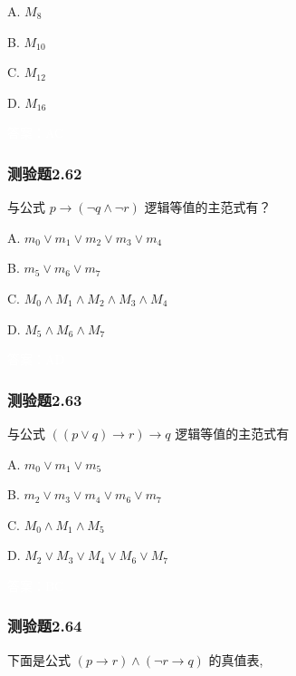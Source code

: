 \documentclass[UTF8, heading=true]{ctexart}
\begin{document}
A. $ M_8$

B. $M_{10}$

C. $ M_{12}$

D. $ M_{16}$

\textcolor{white}{答案：AC}

\subsubsection{测验题2.62}

与公式 $p \rightarrow(\neg q \wedge \neg r)$ 逻辑等值的主范式有？

A. $
m_0 \vee m_1 \vee m_2 \vee m_3 \vee m_4
$


B. $
m_5 \vee m_6 \vee m_7
$


C. $
M_0 \wedge M_1 \wedge M_2 \wedge M_3 \wedge M_4
$


D.  $
M_5 \wedge M_6 \wedge M_7
$

\textcolor{white}{答案：AD}


\subsubsection{测验题2.63}

与公式 $((p \vee q) \rightarrow r) \rightarrow q$ 逻辑等值的主范式有 $\qquad$

A. $ m_0 \vee m_1 \vee m_5$

B. $ m_2 \vee m_3 \vee m_4 \vee m_6 \vee m_7$

C. $ M_0 \wedge M_1 \wedge M_5$

D. $ M_2 \vee M_3 \vee M_4 \vee M_6 \vee M_7$

\textcolor{white}{答案：BC}

\subsubsection{测验题2.64}

下面是公式 $(p \rightarrow r) \wedge(\neg r \rightarrow q)$ 的真值表,
\end{document}
